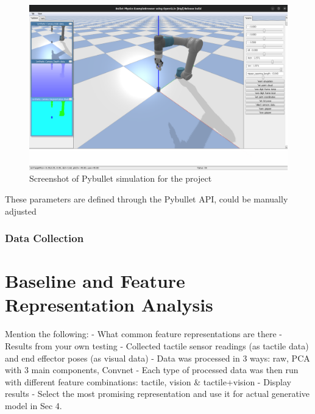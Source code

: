 \documentclass[12pt, a4paper]{report}
\theoremstyle{definition}
\begin{document}
\begin{figure}[H]
    \centering
    \includegraphics[scale=0.25]{docs/Project Report/Media/pybullet_sim.png}
    \caption{Screenshot of Pybullet simulation for the project}
    \label{fig:pbSimScreenshot}
\end{figure}

These parameters are defined through the Pybullet API, could be manually adjusted 


\subsection{Data Collection}
\label{sec:3.3.1}



\chapter{Baseline and Feature Representation Analysis}
\label{chap:4}
Mention the following:
- What common feature representations are there
- Results from your own testing
    - Collected tactile sensor readings (as tactile data) and end effector poses (as visual data)
    - Data was processed in 3 ways: raw, PCA with 3 main components, Convnet
    - Each type of processed data was then run with different feature combinations: tactile, vision \& tactile+vision
    - Display results
- Select the most promising representation and use it for actual generative model in Sec 4.
\end{document}

